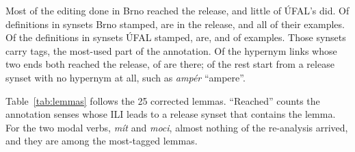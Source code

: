 \documentclass[a4paper,12pt]{article}
\begin{document}
Most of the editing done in Brno reached the release, and little of
ÚFAL's did.  Of
 definitions in synsets Brno stamped,
 are in the release, and all
 of their examples.  Of the 
definitions in synsets ÚFAL stamped,  are, and
 of  examples.  Those
 synsets carry  tags, the
most-used part of the annotation.  Of the hypernym links whose two ends
both reached the release,  of 
are there;  of the rest start from a release synset
with no hypernym at all, such as \textit{ampér} ``ampere''.

Table~\ref{tab:lemmas} follows the 25 corrected lemmas.  ``Reached''
counts the annotation senses whose ILI leads to a release synset that
contains the lemma.  For the two modal verbs, \textit{mít} and
\textit{moci}, almost nothing of the re-analysis arrived, and they are
among the most-tagged lemmas.
\end{document}
